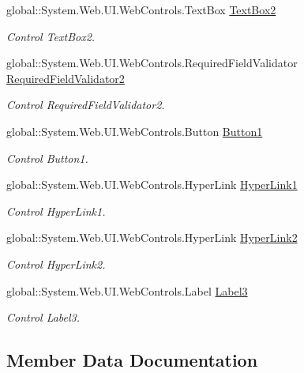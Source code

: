 \begin{DoxyCompactItemize}
global\+::\+System.\+Web.\+U\+I.\+Web\+Controls.\+Text\+Box \mbox{\hyperlink{class_inicio_1_1_login_ac99495a6fbd78cbf118b7c058815e9f2}{Text\+Box2}}
\begin{DoxyCompactList}\small\item\em Control Text\+Box2. \end{DoxyCompactList}\item 
global\+::\+System.\+Web.\+U\+I.\+Web\+Controls.\+Required\+Field\+Validator \mbox{\hyperlink{class_inicio_1_1_login_a072466936abf9e49afe63fb3874ddee6}{Required\+Field\+Validator2}}
\begin{DoxyCompactList}\small\item\em Control Required\+Field\+Validator2. \end{DoxyCompactList}\item 
global\+::\+System.\+Web.\+U\+I.\+Web\+Controls.\+Button \mbox{\hyperlink{class_inicio_1_1_login_a538759688d96a18839d8cf330a38b4e0}{Button1}}
\begin{DoxyCompactList}\small\item\em Control Button1. \end{DoxyCompactList}\item 
global\+::\+System.\+Web.\+U\+I.\+Web\+Controls.\+Hyper\+Link \mbox{\hyperlink{class_inicio_1_1_login_a3370ab8441b3a73d003560dcbcaff0d9}{Hyper\+Link1}}
\begin{DoxyCompactList}\small\item\em Control Hyper\+Link1. \end{DoxyCompactList}\item 
global\+::\+System.\+Web.\+U\+I.\+Web\+Controls.\+Hyper\+Link \mbox{\hyperlink{class_inicio_1_1_login_a51395541b60da1b91a7cbbd240b4c0f3}{Hyper\+Link2}}
\begin{DoxyCompactList}\small\item\em Control Hyper\+Link2. \end{DoxyCompactList}\item 
global\+::\+System.\+Web.\+U\+I.\+Web\+Controls.\+Label \mbox{\hyperlink{class_inicio_1_1_login_ad052535d49bad44248dd771596f4a8af}{Label3}}
\begin{DoxyCompactList}\small\item\em Control Label3. \end{DoxyCompactList}\end{DoxyCompactItemize}


\subsection{Member Data Documentation}
\mbox{\label{class_inicio_1_1_login_a538759688d96a18839d8cf330a38b4e0}} 
